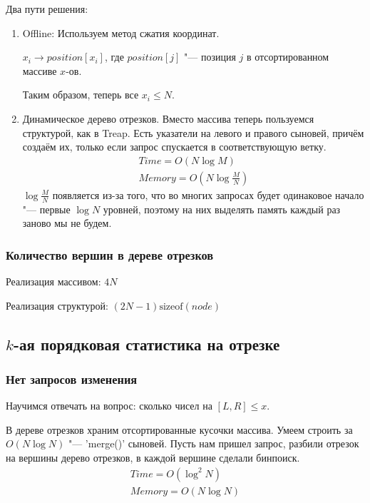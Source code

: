Два пути решения:
\begin{enumerate}
\item
	Offline: Используем метод сжатия координат.
	
	$x_i \rightarrow position[x_i]$, где $position[j]$ "--- позиция $j$ в отсортированном массиве $x$-ов.

	Таким образом, теперь все $x_i \le N$.

\item
	Динамическое дерево отрезков.
	Вместо массива теперь пользуемся структурой, как в Treap.
	Есть указатели на левого и правого сыновей, причём создаём их, только если запрос спускается в соответствующую ветку.
	\begin{gather*}
		Time = O(N \log M) \\
		Memory = O(N \log \frac{M}{N})
	\end{gather*}
	$\log \frac{M}{N}$ появляется из-за того, что во многих запросах будет одинаковое начало "--- первые $\log N$ уровней,
	поэтому на них выделять память каждый раз заново мы не будем.
\end{enumerate}
		
\subsubsection{Количество вершин в дереве отрезков}
			
Реализация массивом: $4N$

Реализация структурой: $(2N-1)\mathup{sizeof}(node)$

\subsection[k-ая порядковая статистика на отрезке]{$k$-ая порядковая статистика на отрезке}

\subsubsection{Нет запросов изменения}

Научимся отвечать на вопрос: сколько чисел на $[L, R] \le x$.

В дереве отрезков храним отсортированные кусочки массива. Умеем строить за $O(N\log N)$ "--- \cpp'merge()' сыновей.
Пусть нам пришел запрос, разбили отрезок на вершины дерево отрезков, в каждой вершине сделали бинпоиск.
\begin{gather*}
	Time = O(\log^2 N) \\
	Memory = O(N \log N)
\end{gather*}

